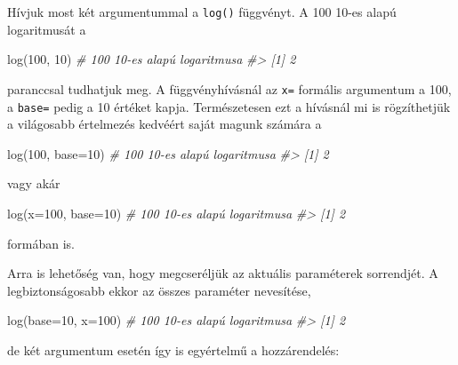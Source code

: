 \documentclass[
]{book}
\newenvironment{Shaded}{\begin{snugshade}}{\end{snugshade}}
\newcommand{\AttributeTok}[1]{\textcolor[rgb]{0.77,0.63,0.00}{#1}}
\newcommand{\CommentTok}[1]{\textcolor[rgb]{0.56,0.35,0.01}{\textit{#1}}}
\newcommand{\DecValTok}[1]{\textcolor[rgb]{0.00,0.00,0.81}{#1}}
\newcommand{\FunctionTok}[1]{\textcolor[rgb]{0.00,0.00,0.00}{#1}}
\newcommand{\NormalTok}[1]{#1}
\begin{document}
Hívjuk most két argumentummal a \texttt{log()} függvényt. A 100 10-es alapú logaritmusát a

\begin{Shaded}
\begin{Highlighting}[]
\FunctionTok{log}\NormalTok{(}\DecValTok{100}\NormalTok{, }\DecValTok{10}\NormalTok{)        }\CommentTok{\# 100 10{-}es alapú logaritmusa}
\CommentTok{\#\textgreater{} [1] 2}
\end{Highlighting}
\end{Shaded}

paranccsal tudhatjuk meg. A függvényhívásnál az \texttt{x=} formális argumentum a 100, a \texttt{base=} pedig a 10 értéket kapja. Természetesen ezt a hívásnál mi is rögzíthetjük a világosabb értelmezés kedvéért saját magunk számára a

\begin{Shaded}
\begin{Highlighting}[]
\FunctionTok{log}\NormalTok{(}\DecValTok{100}\NormalTok{, }\AttributeTok{base=}\DecValTok{10}\NormalTok{)    }\CommentTok{\# 100 10{-}es alapú logaritmusa}
\CommentTok{\#\textgreater{} [1] 2}
\end{Highlighting}
\end{Shaded}

vagy akár

\begin{Shaded}
\begin{Highlighting}[]
\FunctionTok{log}\NormalTok{(}\AttributeTok{x=}\DecValTok{100}\NormalTok{, }\AttributeTok{base=}\DecValTok{10}\NormalTok{)  }\CommentTok{\# 100 10{-}es alapú logaritmusa}
\CommentTok{\#\textgreater{} [1] 2}
\end{Highlighting}
\end{Shaded}

formában is.

Arra is lehetőség van, hogy megcseréljük az aktuális paraméterek sorrendjét. A legbiztonságosabb ekkor az összes paraméter nevesítése,

\begin{Shaded}
\begin{Highlighting}[]
\FunctionTok{log}\NormalTok{(}\AttributeTok{base=}\DecValTok{10}\NormalTok{, }\AttributeTok{x=}\DecValTok{100}\NormalTok{)  }\CommentTok{\# 100 10{-}es alapú logaritmusa}
\CommentTok{\#\textgreater{} [1] 2}
\end{Highlighting}
\end{Shaded}

de két argumentum esetén így is egyértelmű a hozzárendelés:
\end{document}
